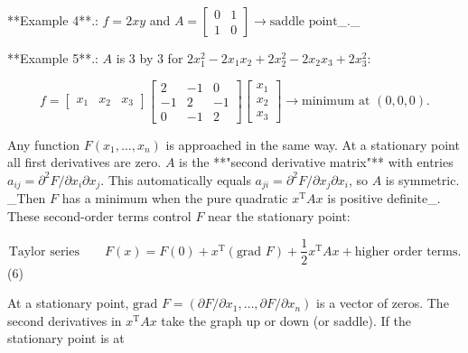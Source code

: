 **Example 4**.: \(f=2xy\) and \(A=\begin{bmatrix}0&1\\ 1&0\end{bmatrix}\to\text{saddle point}\)_._

**Example 5**.: \(A\) is 3 by 3 for \(2x_{1}^{2}-2x_{1}x_{2}+2x_{2}^{2}-2x_{2}x_{3}+2x_{3}^{2}\):

\[f=\begin{bmatrix}x_{1}&x_{2}&x_{3}\end{bmatrix}\begin{bmatrix}2&-1&0\\ -1&2&-1\\ 0&-1&2\end{bmatrix}\begin{bmatrix}x_{1}\\ x_{2}\\ x_{3}\end{bmatrix}\to\text{minimum at }(0,0,0).\]

Any function \(F(x_{1},\ldots,x_{n})\) is approached in the same way. At a stationary point all first derivatives are zero. \(A\) is the **"second derivative matrix"** with entries \(a_{ij}=\partial^{2}F/\partial x_{i}\partial x_{j}\). This automatically equals \(a_{ji}=\partial^{2}F/\partial x_{j}\partial x_{i}\), so \(A\) is symmetric. _Then \(F\) has a minimum when the pure quadratic \(x^{\mathrm{T}}Ax\) is positive definite_. These second-order terms control \(F\) near the stationary point:

\[\text{Taylor series}\qquad F(x)=F(0)+x^{\mathrm{T}}(\text{grad }F)+\frac{1}{2}x^{\mathrm{T}}Ax+\text{higher order terms}.\] (6)

At a stationary point, \(\text{grad }F=(\partial F/\partial x_{1},\ldots,\partial F/\partial x_{n})\) is a vector of zeros. The second derivatives in \(x^{\mathrm{T}}Ax\) take the graph up or down (or saddle). If the stationary point is at 